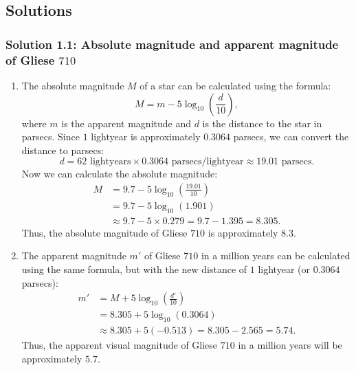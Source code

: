 \subsection{Solutions}
\subsubsection*{Solution 1.1: Absolute magnitude and apparent magnitude of Gliese $710$}
\begin{enumerate}[label=(\alph*)]
    \item The absolute magnitude $M$ of a star can be calculated using the formula:
    \begin{equation}
    M = m - 5 \log_{10} \left( \frac{d}{10} \right),
    \end{equation}
    where $m$ is the apparent magnitude and $d$ is the distance to the star in parsecs. Since $1$ lightyear is approximately $0.3064$ parsecs, we can convert the distance to parsecs:
    \begin{equation}
    d = 62 \text{ lightyears} \times 0.3064 \text{ parsecs/lightyear} \approx 19.01 \text{ parsecs}.
    \end{equation}
    Now we can calculate the absolute magnitude:
    \begin{align*}
    M &= 9.7 - 5 \log_{10} \left( \frac{19.01}{10} \right) \\
      &= 9.7 - 5 \log_{10} (1.901) \\
      &\approx 9.7 - 5 \times 0.279 = 9.7 - 1.395 = 8.305.
    \end{align*}
    Thus, the absolute magnitude of Gliese $710$ is approximately $8.3$.
    
    \item The apparent magnitude $m'$ of Gliese $710$ in a million years can be calculated using the same formula, but with the new distance of $1$ lightyear (or $0.3064$ parsecs):
    \begin{align*}
    m' &= M + 5 \log_{10} \left( \frac{d'}{10} \right) \\
       &= 8.305 + 5 \log_{10} (0.3064) \\
       &\approx 8.305 + 5 (-0.513) = 8.305 - 2.565 = 5.74.
    \end{align*}
    Thus, the apparent visual magnitude of Gliese $710$ in a million years will be approximately $5.7$.
\end{enumerate}

